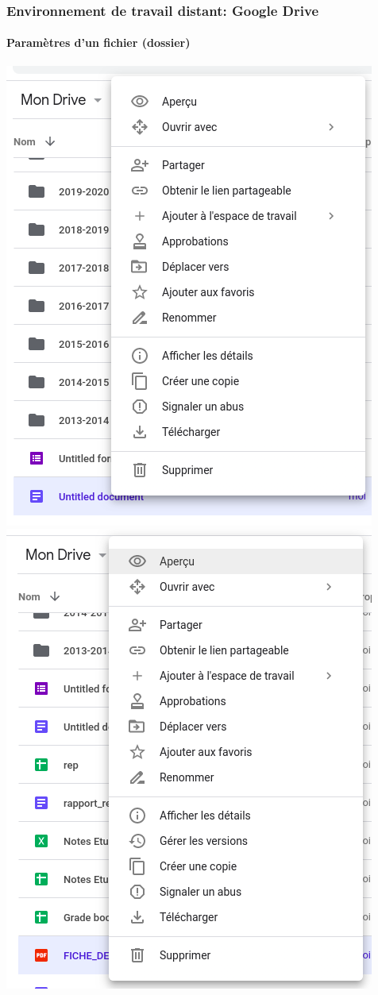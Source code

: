 \documentclass[xcolor=table]{beamer}
\begin{document}
\begin{frame}
\frametitle{Environnement de travail distant: Google Drive}
\framesubtitle{Paramètres d'un fichier (dossier)}

\begin{center}
	\includegraphics[height=
	.8\textheight]{../img/Bweb01-environnement/drive-options1.png}
	\includegraphics[height=
	.8\textheight]{../img/Bweb01-environnement/drive-options2.png}
\end{center}

\end{frame}
\end{document}

